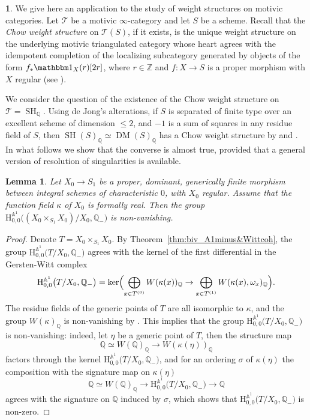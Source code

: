 \documentclass[JEP,XML,SOM,Unicode]{cedram}
\newcommand{\T}{\mathscr T}
\renewcommand{\AA}{\mathbb A}
\newcommand{\un}{\mathbbm 1}
\newcommand{\BA}{\mathrm H^{\AA^1}}
\DeclareMathOperator{\DM}{DM}
\DeclareMathOperator{\SH}{SH}
\newcommand{\ZZ} {\mathbb Z}
\newcommand{\QQ} {\mathbb Q}
\newtheorem{lm}[thm]{Lemma}
\theoremstyle{remark}
\theoremstyle{definition}
\newtheorem{num}[thm]{}
\numberwithin{equation}{thm}
\begin{document}
\begin{num}
We give here an application to the study of weight structures on motivic categories. Let $\T$ be a motivic $\infty$-category and let $S$ be a scheme. Recall that the \emph{Chow weight structure} on $\T(S)$, if it exists, is the unique weight structure on the underlying motivic triangulated category whose heart agrees with the idempotent completion of the localizing subcategory generated by objects of the form $f_*\un_X(r)[2r]$, where $r\in\ZZ$ and $f:X\to S$ is a proper morphism with $X$ regular (see \cite[Th.\,2.1]{Bondarkorweight}).

We consider the question of the existence of the Chow weight structure on $\T=\SH_\QQ$.
Using de Jong's alterations, if $S$ is separated of finite type over an excellent scheme of dimension $\leqslant 2$, and $-1$ is a sum of squares in any residue field of $S$, then $\SH(S)_{\QQ}\simeq\DM(S)_{\QQ}$ has a Chow weight structure by \cite{Hebert} and \cite{Bondarkorweight}. In what follows we show that the converse is almost true, provided that a general version of resolution of singularities is available.

\begin{lm}
\label{lm:BMWnonvan}
Let $X_0\to S_1$ be a proper, dominant, generically finite morphism between integral schemes of characteristic $0$, with $X_0$ regular. Assume that the function field $\kappa$ of $X_0$ is formally real. Then the group $\BA_{0,0}\big((X_0\times_{S_1}X_0)/X_0,\QQ_-\big)$ is non-vanishing.
\end{lm}
\begin{proof}
Denote $T=X_0\times_{S_1}X_0$. By Theorem~\ref{thm:biv_A1minus&Wittcoh}, the group $\BA_{0,0}\big(T/X_0,\QQ_-\big)$ agrees with the kernel of the first differential in the Gersten-Witt complex
\[
\BA_{0,0}\big(T/X_0,\QQ_-\big)
=
\ker\Bigl(\bigoplus_{x\in T^{(0)}}W(\kappa(x))_\QQ\to\bigoplus_{x\in T^{(1)}}W(\kappa(x),\omega_x)_\QQ\Bigr).
\]
The residue fields of the generic points of $T$ are all isomorphic to $\kappa$, and the group $W(\kappa)_\QQ$ is non-vanishing by \cite[VIII\,6.15]{LamQuadratic}.
This implies that the group $\BA_{0,0}\big(T/X_0,\QQ_-\big)$ is non-vanishing: indeed, let $\eta$ be a generic point of $T$, then the structure map
\[\QQ\simeq W(\QQ)_\QQ\to W(\kappa(\eta))_\QQ\]
factors through the kernel $\BA_{0,0}\big(T/X_0,\QQ_-\big)$, and for an ordering $\sigma$ of $\kappa(\eta)$ the composition with the signature map on $\kappa(\eta)$
\[\QQ\simeq W(\QQ)_\QQ\to \BA_{0,0}\big(T/X_0,\QQ_-\big)\to\QQ\]
agrees with the signature on $\QQ$ induced by $\sigma$, which shows that $\BA_{0,0}\big(T/X_0,\QQ_-\big)$ is non-zero.
\end{proof}


\end{num}
\end{document}
